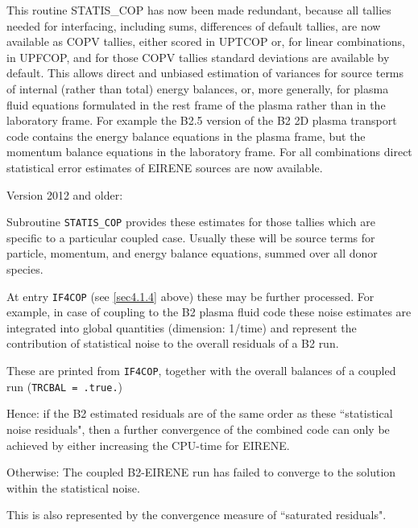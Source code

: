 This routine STATIS\_COP has now been made redundant, because all tallies
needed for interfacing, including sums, differences of default tallies, are now
available as COPV tallies, either scored in UPTCOP or, for linear combinations,
in UPFCOP, and for those COPV tallies standard deviations are available by
default.
This allows direct and unbiased estimation of variances for source terms of
internal (rather than total) energy balances, or, more generally, for plasma
fluid equations formulated in the rest frame of the plasma rather than in the
laboratory frame.
For example the B2.5 version of the B2 2D plasma transport code contains the
energy balance equations in the plasma frame, but the momentum balance
equations in the laboratory frame.
For all combinations direct statistical error estimates of EIRENE sources are
now available.

\bigskip

Version 2012 and older:

Subroutine \lstinline|STATIS_COP| provides these estimates for those tallies
which are specific to a particular coupled case.
Usually these will be source terms for particle, momentum, and energy balance
equations, summed over all donor species.

At entry \lstinline|IF4COP| (see \cref{sec4.1.4} above) these may be
further processed.
For example, in case of coupling to the B2 plasma fluid code these noise
estimates are integrated into global quantities (dimension: 1/time) and
represent the contribution of statistical noise to the overall residuals of a
B2 run.

These are printed from \lstinline|IF4COP|, together with the overall
balances of a coupled run (\lstinline|TRCBAL = .true.|) 

Hence: if the B2 estimated residuals are of the same order as these
``statistical noise residuals", then a further convergence of the combined code
can only be achieved by either increasing the CPU-time for EIRENE.

Otherwise: The coupled B2-EIRENE run has failed to converge to the solution
within the statistical noise.

This is also represented by the convergence measure of ``saturated residuals".
